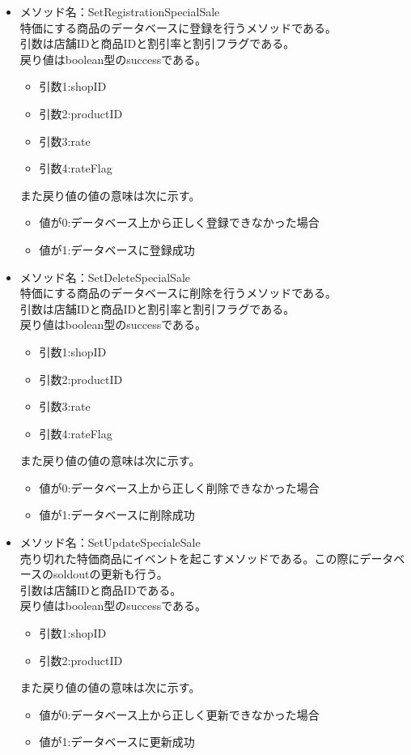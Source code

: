 \documentclass[a4j]{jarticle}
\begin{document}
\begin{itemize}
\item メソッド名：SetRegistrationSpecialSale\\

特価にする商品のデータベースに登録を行うメソッドである。\\
引数は店舗IDと商品IDと割引率と割引フラグである。\\
戻り値はboolean型のsuccessである。
	\begin{itemize}
		\item 引数1:shopID
		\item 引数2:productID
		\item 引数3:rate
		\item 引数4:rateFlag
	\end{itemize}
また戻り値の値の意味は次に示す。
	\begin{itemize}
		\item 値が0:データベース上から正しく登録できなかった場合
		\item 値が1:データベースに登録成功
	\end{itemize}
%
\item メソッド名：SetDeleteSpecialSale\\

特価にする商品のデータベースに削除を行うメソッドである。\\
引数は店舗IDと商品IDと割引率と割引フラグである。\\
戻り値はboolean型のsuccessである。
	\begin{itemize}
		\item 引数1:shopID
		\item 引数2:productID
		\item 引数3:rate
		\item 引数4:rateFlag
	\end{itemize}
また戻り値の値の意味は次に示す。
	\begin{itemize}
		\item 値が0:データベース上から正しく削除できなかった場合
		\item 値が1:データベースに削除成功
	\end{itemize}
%
\item メソッド名：SetUpdateSpecialeSale\\

売り切れた特価商品にイベントを起こすメソッドである。この際にデータベースのsoldoutの更新も行う。\\
引数は店舗IDと商品IDである。\\
戻り値はboolean型のsuccessである。
	\begin{itemize}
		\item 引数1:shopID
		\item 引数2:productID
	\end{itemize}
また戻り値の値の意味は次に示す。
	\begin{itemize}
		\item 値が0:データベース上から正しく更新できなかった場合
		\item 値が1:データベースに更新成功
	\end{itemize}


\end{itemize}
\end{document}
